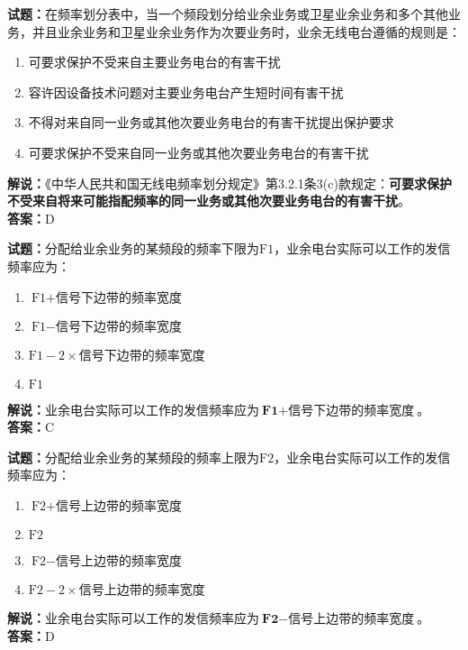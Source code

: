 \documentclass{ctexbook}
\begin{document}
\vspace{\baselineskip}

\noindent\textbf{试题：}在频率划分表中，当一个频段划分给业余业务或卫星业余业务和多个其他业务，并且业余业务和卫星业余业务作为次要业务时，业余无线电台遵循的规则是：
\begin{enumerate}[leftmargin=3em]
  \item 可要求保护不受来自主要业务电台的有害干扰
  \item 容许因设备技术问题对主要业务电台产生短时间有害干扰
  \item 不得对来自同一业务或其他次要业务电台的有害干扰提出保护要求
  \item 可要求保护不受来自同一业务或其他次要业务电台的有害干扰
\end{enumerate}
\noindent\textbf{解说：}《中华人民共和国无线电频率划分规定》第3.2.1条3(c)款规定：\textbf{可要求保护不受来自将来可能指配频率的同一业务或其他次要业务电台的有害干扰}。\\\textbf{答案：}D

\vspace{\baselineskip}

\noindent\textbf{试题：}分配给业余业务的某频段的频率下限为\(\textrm{F1}\)，业余电台实际可以工作的发信频率应为：
\begin{enumerate}[leftmargin=3em]
  \item \(\textrm{F1} + \textrm{信号下边带的频率宽度}\)
  \item \(\textrm{F1} - \textrm{信号下边带的频率宽度}\)
  \item \(\textrm{F1} - 2 \times \textrm{信号下边带的频率宽度}\)
  \item \(\textrm{F1}\)
\end{enumerate}
\noindent\textbf{解说：}业余电台实际可以工作的发信频率应为\(\textbf{F1} + \textbf{信号下边带的频率宽度}\)。
\\\noindent\textbf{答案：}C

\vspace{\baselineskip}

\noindent\textbf{试题：}分配给业余业务的某频段的频率上限为\(\textrm{F2}\)，业余电台实际可以工作的发信频率应为：
\begin{enumerate}[leftmargin=3em]
  \item \(\textrm{F2} + \textrm{信号上边带的频率宽度}\)
  \item \(\textrm{F2}\)
  \item \(\textrm{F2} - \textrm{信号上边带的频率宽度}\)
  \item \(\textrm{F2} - 2 \times \textrm{信号上边带的频率宽度}\)
\end{enumerate}
\noindent\textbf{解说：}业余电台实际可以工作的发信频率应为\(\textbf{F2} - \textbf{信号上边带的频率宽度}\)。
\\\noindent\textbf{答案：}D
\end{document}
